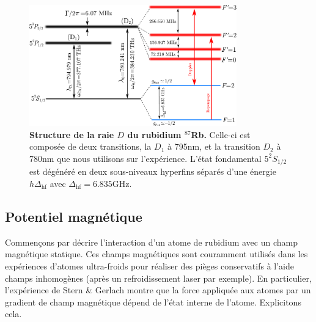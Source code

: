\begin{figure}
\centering
\includegraphics[width=0.8\textwidth]{Fig/BEC_manip/Rb87.pdf}
\caption{\textbf{Structure de la raie $D$ du rubidium ${}^{87}$Rb.} Celle-ci est composée de deux transitions, la $D_1$ à 795nm, et la transition $D_2$ à 780nm que nous utilisons sur l'expérience. L'état fondamental $5^2S_{1/2}$ est dégénéré en deux sous-niveaux hyperfins séparés d'une énergie $h \Delta_{\mathrm{hf}}$ avec $\Delta_{\mathrm{hf}}=6.835$GHz.}
\label{fig:Rb87}
\end{figure}

\subsection{Potentiel magnétique}
Commençons par décrire l'interaction d'un atome de rubidium avec un champ magnétique statique. Ces champs magnétiques sont couramment utilisés dans les expériences d'atomes ultra-froids pour réaliser des pièges conservatifs à l'aide champs inhomogènes (après un refroidissement laser par exemple). En particulier, l'expérience de Stern \& Gerlach montre que la force appliquée aux atomes par un gradient de champ magnétique dépend de l'état interne de l'atome. Explicitons cela.


